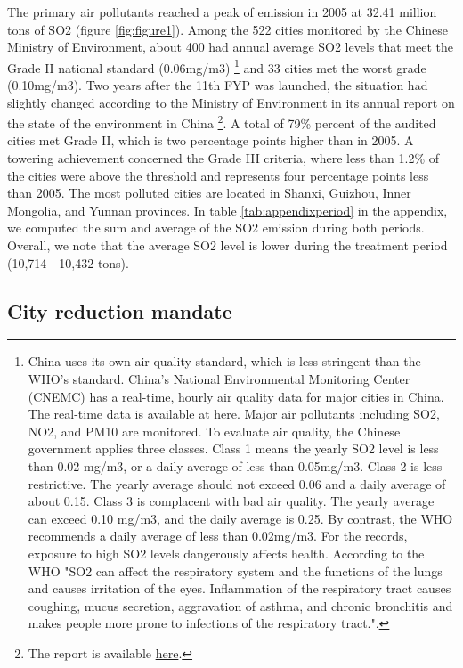 \documentclass[12pt]{article}
\begin{document}
The primary air pollutants reached a peak of emission in 2005 at 32.41 million tons of SO2 (figure \ref{fig:figure1}). Among the 522 cities monitored by the Chinese Ministry of Environment, about 400 had annual average SO2 levels that meet the Grade II national standard (0.06mg/m3) \footnote{China uses its own air quality standard, which is less stringent than the WHO’s standard. China's National Environmental Monitoring Center (CNEMC) has a real-time, hourly air quality data for major cities in China. The real-time data is available at \href{http://www.cnemc.cn/}{here}. Major air pollutants including SO2, NO2, and PM10 are monitored. To evaluate air quality, the Chinese government applies three classes. Class 1 means the yearly SO2 level is less than 0.02 mg/m3, or a daily average of less than 0.05mg/m3. Class 2 is less restrictive. The yearly average should not exceed 0.06 and a daily average of about 0.15. Class 3 is complacent with bad air quality. The yearly average can exceed 0.10 mg/m3, and the daily average is 0.25. By contrast, the \href{https://www.who.int/news-room/fact-sheets/detail/ambient-(outdoor)-air-quality-and-health}{WHO} recommends a daily average of less than 0.02mg/m3. For the records, exposure to high SO2 levels dangerously affects health. According to the WHO "SO2 can affect the respiratory system and the functions of the lungs and causes irritation of the eyes. Inflammation of the respiratory tract causes coughing, mucus secretion, aggravation of asthma, and chronic bronchitis and makes people more prone to infections of the respiratory tract.".} and 33 cities met the worst grade (0.10mg/m3). Two years after the 11th FYP was launched, the situation had slightly changed according to the Ministry of Environment in its annual report on the state of the environment in China \footnote{The report is available \href{http://english.mee.gov.cn/Resources/Reports/soe/soe2007/201}{here}.}. A total of 79\% percent of the audited cities met Grade II, which is two percentage points higher than in 2005. A towering achievement concerned the Grade III criteria, where less than 1.2\% of the cities were above the threshold and represents four percentage points less than 2005. The most polluted cities are located in Shanxi, Guizhou, Inner Mongolia, and Yunnan provinces. In table \ref{tab:appendixperiod} in the appendix, we computed the sum and average of the SO2 emission during both periods. Overall, we note that the average SO2 level is lower during the treatment period (10,714 - 10,432 tons).


\subsection{City reduction mandate} \label{sec:mandate}
\end{document}
